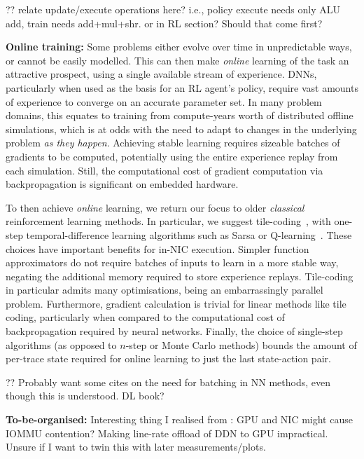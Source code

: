 \documentclass[sigconf,natbib=false]{acmart}
\newcommand{\fakepara}[1]{\noindent\textbf{#1:}}
\begin{document}
?? relate update/execute operations here? i.e., policy execute needs only ALU add, train needs add+mul+shr. or in RL section? Should that come first?

\fakepara{Online training}
Some problems either evolve over time in unpredictable ways, or cannot be easily modelled.
This can then make \emph{online} learning of the task an attractive prospect, using a single available stream of experience.
DNNs, particularly when used as the basis for an RL agent's policy, require vast amounts of experience to converge on an accurate parameter set.
In many problem domains, this equates to training from compute-years worth of distributed offline simulations, which is at odds with the need to adapt to changes in the underlying problem \emph{as they happen}.
Achieving stable learning requires sizeable batches of gradients to be computed, potentially using the entire experience replay from each simulation.
Still, the computational cost of gradient computation via backpropagation is significant on embedded hardware.

To then achieve \emph{online} learning, we return our focus to older \emph{classical} reinforcement learning methods.
In particular, we suggest tile-coding~\cite[pp. \numrange{217}{221}]{RL2E}, with one-step temporal-difference learning algorithms such as Sarsa or Q-learning~\cite[pp. \numrange{129}{132}]{RL2E}.
These choices have important benefits for in-NIC execution.
Simpler function approximators do not require batches of inputs to learn in a more stable way, negating the additional memory required to store experience replays.
Tile-coding in particular admits many optimisations, being an embarrassingly parallel problem.
Furthermore, gradient calculation is trivial for linear methods like tile coding, particularly when compared to the computational cost of backpropagation required by neural networks.
Finally, the choice of single-step algorithms (as opposed to $n$-step or Monte Carlo methods) bounds the amount of per-trace state required for online learning to just the last state-action pair.

?? Probably want some cites on the need for batching in NN methods, even though this is understood. DL book?

\fakepara{To-be-organised}
Interesting thing I realised from \textcite{DBLP:conf/sigcomm/NeugebauerAZAL018}: GPU and NIC might cause IOMMU contention? Making line-rate offload of DDN to GPU impractical. Unsure if I want to twin this with later measurements/plots.
\end{document}
